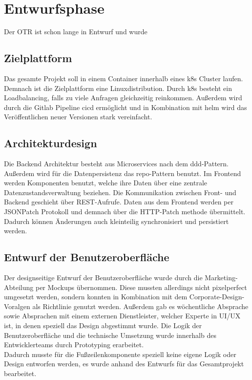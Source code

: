 \newpage
\section{Entwurfsphase}
\label{entwurfsphase}
Der \ac{OTR} ist schon lange in Entwurf und wurde 
\subsection{Zielplattform}
\label{zielplattform}
Das gesamte Projekt soll in einem \gls{Container} innerhalb eines \gls{k8s} Cluster laufen. Demnach ist die Zielplattform eine Linuxdistribution. Durch \gls{k8s} besteht ein Loadbalancing, falls zu viele Anfragen gleichzeitig reinkommen. Außerdem wird durch die Gitlab Pipeline \ac{cicd} ermöglicht und in Kombination mit \gls{helm} wird das Veröffentlichen neuer Versionen stark vereinfacht.
\subsection{Architekturdesign}
\label{architekturdesign}
Die Backend Architektur besteht aus Microservices nach dem \ac{ddd}-Pattern. Außerdem wird für die Datenpersistenz das \gls{repo}-Pattern benutzt. Im Frontend werden Komponenten benutzt, welche ihre Daten über eine zentrale Datenzustandsverwaltung beziehen. Die Kommunikation zwischen Front- und Backend geschieht über \gls{REST}-Aufrufe. Daten aus dem Frontend werden per JSONPatch Protokoll und demnach über die HTTP-Patch methode übermittelt. Dadurch können Änderungen auch kleinteilig synchronisiert und persistiert werden.
\subsection{Entwurf der Benutzeroberfläche}
\label{benutzeroberfläche}
Der designseitige Entwurf der Benutzeroberfläche wurde durch die Marketing-Abteilung per Mockups übernommen. Diese mussten allerdings nicht pixelperfect umgesetzt werden, sondern konnten in Kombination mit dem Corporate-Design-Voralgen als Richtlinie genutzt werden. Außerdem gab es wöchentliche Absprache sowie Absprachen mit einem externen Dienstleister, welcher Experte in UI/UX ist, in denen speziell das Design abgestimmt wurde. Die Logik der Benutzeroberfläche und die technische Umsetzung wurde innerhalb des Entwicklerteams durch Prototyping erarbeitet.\\
Dadurch musste für die Fußzeilenkomponente speziell keine eigene Logik oder Design entworfen werden, es wurde anhand des Entwurfs für das Gesamtprojekt bearbeitet.
